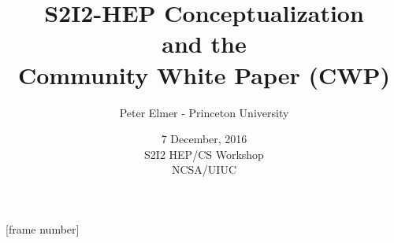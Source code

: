 \documentclass{beamer}
\title{S2I2-HEP Conceptualization \\
       and the \\
       Community White Paper (CWP)}
\author{Peter Elmer - Princeton University}
\date{7 December, 2016 \\ S2I2 HEP/CS Workshop \\ NCSA/UIUC}
\begin{document}
\maketitle

%
%

[frame number]















%


%

















%





%






%
\end{document}
